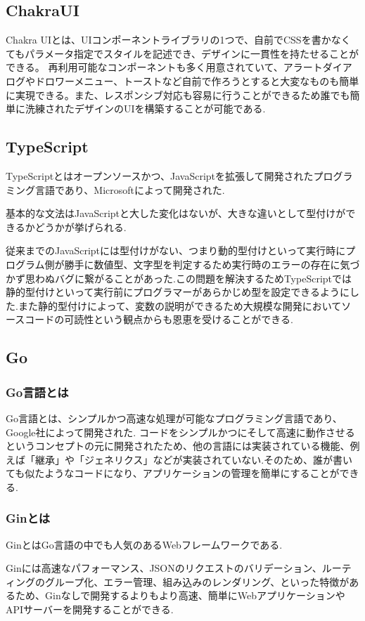 \documentclass[submit,techrep]{ipsj}
\begin{document}
\subsection{ChakraUI}
Chakra UIとは、UIコンポーネントライブラリの1つで、自前でCSSを書かなくてもパラメータ指定でスタイルを記述でき、デザインに一貫性を持たせることができる。
再利用可能なコンポーネントも多く用意されていて、アラートダイアログやドロワーメニュー、トーストなど自前で作ろうとすると大変なものも簡単に実現できる。また、レスポンシブ対応も容易に行うことができるため誰でも簡単に洗練されたデザインのUIを構築することが可能である.

\subsection{TypeScript}
TypeScriptとはオープンソースかつ、JavaScriptを拡張して開発されたプログラミング言語であり、Microsoftによって開発された.

基本的な文法はJavaScriptと大した変化はないが、大きな違いとして型付けができるかどうかが挙げられる.

従来までのJavaScriptには型付けがない、つまり動的型付けといって実行時にプログラム側が勝手に数値型、文字型を判定するため実行時のエラーの存在に気づかず思わぬバグに繋がることがあった.この問題を解決するためTypeScriptでは静的型付けといって実行前にプログラマーがあらかじめ型を設定できるようにした.また静的型付けによって、変数の説明ができるため大規模な開発においてソースコードの可読性という観点からも恩恵を受けることができる.


\subsection{Go}
\subsubsection{Go言語とは}
Go言語とは、シンプルかつ高速な処理が可能なプログラミング言語であり、Google社によって開発された.
コードをシンプルかつにそして高速に動作させるというコンセプトの元に開発されたため、他の言語には実装されている機能、例えば「継承」や「ジェネリクス」などが実装されていない.そのため、誰が書いても似たようなコードになり、アプリケーションの管理を簡単にすることができる.
\subsubsection{Ginとは}
GinとはGo言語の中でも人気のあるWebフレームワークである.

Ginには高速なパフォーマンス、JSONのリクエストのバリデーション、ルーティングのグループ化、エラー管理、組み込みのレンダリング、といった特徴があるため、Ginなしで開発するよりもより高速、簡単にWebアプリケーションやAPIサーバーを開発することができる.
\end{document}
